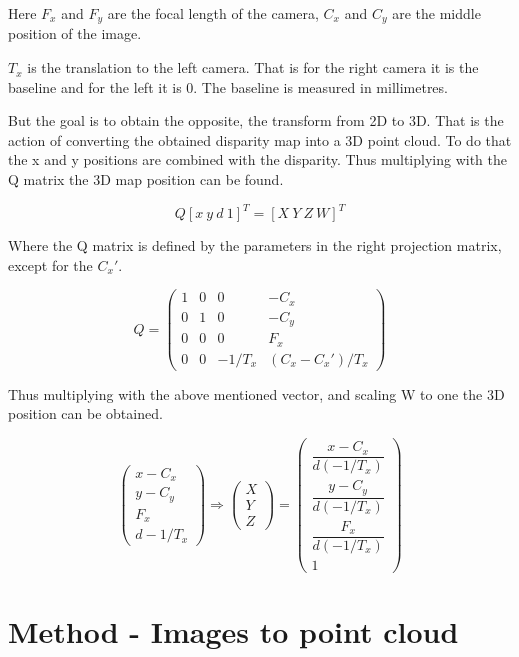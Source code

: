 Here $F_{x}$ and $F_{y}$ are the focal length of the camera, $C_{x}$ and $C_{y}$ are the middle position of the image.

$T_{x}$ is the translation to the left camera. That is for the right camera it is the baseline and for the left it is 0. The baseline is measured in millimetres. 

But the goal is to obtain the opposite, the transform from 2D to 3D. That is the action of converting the obtained disparity map into a 3D point cloud. To do that the x and y positions are combined with the disparity. Thus multiplying with the Q matrix the 3D map position can be found.

\[ Q [ x \ y \ d \ 1 ]^{T} = [ X \ Y \ Z \ W ]^{T} \]

Where the Q matrix is defined by the parameters in the right projection matrix, except for the $C_{x}'$.

\[
Q =
 \begin{pmatrix}
  1 & 0 & 0 & -C_{x} \\
  0 & 1 & 0 & -C_{y} \\
  0 & 0 & 0 & F_{x} \\
  0 & 0 & -1/T_{x} & (C_{x}-C_{x}')/T_{x} 
 \end{pmatrix}
\]

Thus multiplying with the above mentioned vector, and scaling W to one the 3D position can be obtained.

\[
 \begin{pmatrix}
  x - C_{x} \\
  y - C_{y} \\
  F_{x} \\
  d-1/T_{x} 
 \end{pmatrix}
 \Rightarrow
  \begin{pmatrix}  
  X\\
  Y\\
  Z
 \end{pmatrix}
 =
 \begin{pmatrix}
  \dfrac{x - C_{x}}{ d(-1/T_{x})}  \\
  \dfrac{y - C_{y} }{ d(-1/T_{x})}\\
  \dfrac{F_{x}}{ d(-1/T_{x})}\\
  1
 \end{pmatrix}
\]

\section{Method - Images to point cloud}

